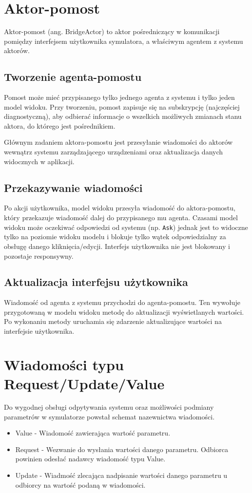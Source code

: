 {\section{Aktor-pomost} \label{sec:aktor-pomost}
Aktor-pomost (ang. BridgeActor) to aktor pośredniczący w komunikacji pomiędzy interfejsem użytkownika symulatora, a właściwym agentem z systemu aktorów. 

\subsection*{Tworzenie agenta-pomostu}
Pomost może mieć przypisanego tylko jednego agenta z systemu i tylko jeden model widoku. Przy tworzeniu, pomost zapisuje się na subskrypcję (najczęściej diagnostyczną), aby odbierać informacje o wszelkich możliwych zmianach stanu aktora, do którego jest pośrednikiem.


Głównym zadaniem aktora-pomostu jest przesyłanie wiadomości do aktorów wewnątrz systemu zarządzającego urządzeniami oraz aktualizacja danych widocznych w aplikacji.

\subsection*{Przekazywanie wiadomości}

Po akcji użytkownika, model widoku przesyła wiadomość do aktora-pomostu, który przekazuje wiadomość dalej do przypisanego mu agenta. Czasami model widoku może oczekiwać odpowiedzi od systemu (np. \lstinline{Ask}) jednak jest to widoczne tylko na poziomie widoku modelu i blokuje tylko wątek odpowiedzialny za obsługę danego kliknięcia/edycji. Interfejs użytkownika nie jest blokowany i pozostaje responsywny.

\subsection*{Aktualizacja interfejsu użytkownika}

Wiadomość od agenta z systemu przychodzi do agenta-pomostu. Ten wywołuje przygotowaną w modelu widoku metodę do aktualizacji wyświetlanych wartości.
Po wykonaniu metody uruchamia się zdarzenie aktualizujące wartości na interfejsie użytkownika.

\section{Wiadomości typu Request/Update/Value}
Do wygodnej obsługi odpytywania systemu oraz możliwości podmiany parametrów w symulatorze powstał schemat nazewnictwa wiadomości.
\begin{itemize}
    \item Value - Wiadomość zawierająca wartość parametru.
    \item Request - Wezwanie do wysłania wartości danego parametru. Odbiorca powinien odesłać nadawcy wiadomość typu Value.
    \item Update - Wiadmość zlecająca nadpisanie wartości danego parametru u odbiorcy na wartość podaną w wiadomości.
\end{itemize}

}
